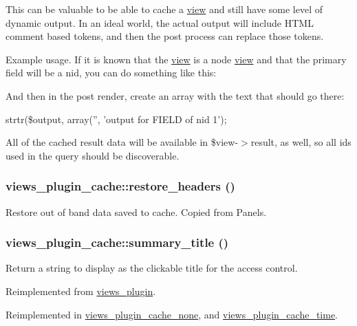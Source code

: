 This can be valuable to be able to cache a \hyperlink{classview}{view} and still have some level of dynamic output. In an ideal world, the actual output will include HTML comment based tokens, and then the post process can replace those tokens.

Example usage. If it is known that the \hyperlink{classview}{view} is a node \hyperlink{classview}{view} and that the primary field will be a nid, you can do something like this:

And then in the post render, create an array with the text that should go there:

strtr(\$output, array('', 'output for FIELD of nid 1');

All of the cached result data will be available in \$view-\/$>$result, as well, so all ids used in the query should be discoverable. \hypertarget{classviews__plugin__cache_a950552f19c93dc2132e73acc4c9198ac}{
\subsubsection[{restore\_\-headers}]{\setlength{\rightskip}{0pt plus 5cm}views\_\-plugin\_\-cache::restore\_\-headers ()}}
\label{classviews__plugin__cache_a950552f19c93dc2132e73acc4c9198ac}
Restore out of band data saved to cache. Copied from Panels. \hypertarget{classviews__plugin__cache_a35e5232e39c8148476328e302787d16b}{
\subsubsection[{summary\_\-title}]{\setlength{\rightskip}{0pt plus 5cm}views\_\-plugin\_\-cache::summary\_\-title ()}}
\label{classviews__plugin__cache_a35e5232e39c8148476328e302787d16b}
Return a string to display as the clickable title for the access control. 

Reimplemented from \hyperlink{classviews__plugin_a9a4aaece48a7cf465dd95d59a3bc5ea1}{views\_\-plugin}.

Reimplemented in \hyperlink{classviews__plugin__cache__none_a52838d0e7db62b5e92f837df6a4931b9}{views\_\-plugin\_\-cache\_\-none}, and \hyperlink{classviews__plugin__cache__time_ac8eaac0cd0c620c7583dbbe0481ca62c}{views\_\-plugin\_\-cache\_\-time}.

